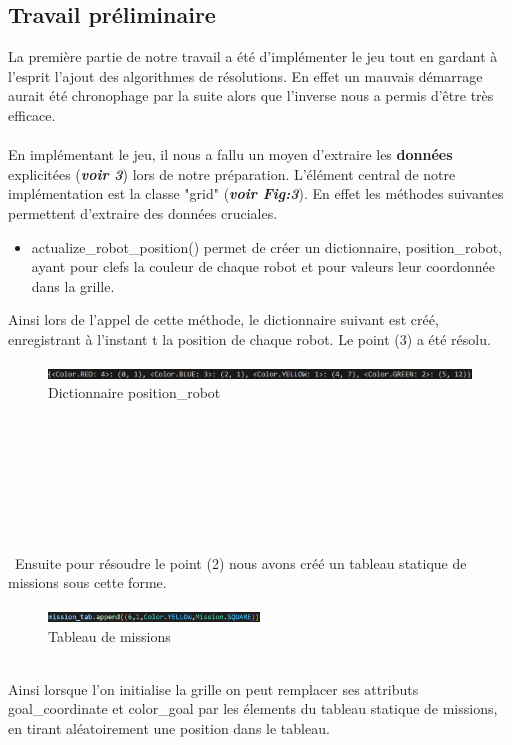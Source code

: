 \documentclass{article}
\begin{document}
\subsection{Travail préliminaire}
La première partie de notre travail a été d'implémenter le jeu tout en gardant à l'esprit l'ajout des algorithmes de résolutions. En effet un mauvais démarrage aurait été chronophage par la suite alors que l'inverse nous a permis d'être très efficace.\\\\
En implémentant le jeu, il nous a fallu un moyen d'extraire les \textbf{données} explicitées (\textit{\textbf{voir 3}}) lors de notre préparation. L'élément central de notre implémentation est la classe "grid" (\textit{\textbf{voir Fig:3}}). En effet les méthodes suivantes permettent d'extraire des données cruciales.
\begin{itemize}
\item actualize\_robot\_position() permet de créer un dictionnaire, position\_robot, ayant pour clefs la couleur de chaque robot et pour valeurs leur coordonnée dans la grille. 
\end{itemize}
Ainsi lors de l'appel de cette méthode, le dictionnaire suivant est créé, enregistrant à l'instant t la position de chaque robot. Le point (3) a été résolu.
\begin{figure}[!h]
  \centering  
  \includegraphics[width=1\textwidth]{dict_pos.png}  
  \caption{Dictionnaire position\_robot} 
  \label{fig:Dict}  
\end{figure}\\\\\\\\\\\\\\\
Ensuite pour résoudre le point (2) nous avons créé un tableau statique de missions sous cette forme.
\begin{figure}[htbp]
  \centering  
  \includegraphics[width=0.5\textwidth]{mission.png}  
  \caption{Tableau de missions} 
  \label{fig:Mission}  
\end{figure}\\
Ainsi lorsque l'on initialise la grille on peut remplacer ses attributs goal\_coordinate et color\_goal par les élements du tableau statique de missions, en tirant aléatoirement une position dans le tableau.\\\\
\end{document}
